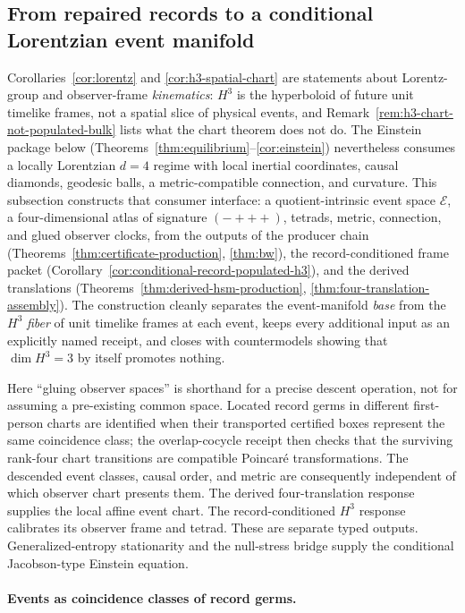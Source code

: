 \documentclass[11pt]{article}
\begin{document}
\subsection{From repaired records to a conditional Lorentzian event manifold}
\label{subsec:event-manifold}

Corollaries~\ref{cor:lorentz} and \ref{cor:h3-spatial-chart} are statements
about Lorentz-group and observer-frame \emph{kinematics}: \(H^3\) is the
hyperboloid of future unit timelike frames, not a spatial slice of physical
events, and Remark~\ref{rem:h3-chart-not-populated-bulk} lists what the chart
theorem does not do. The Einstein package below
(Theorems~\ref{thm:equilibrium}--\ref{cor:einstein}) nevertheless consumes a
locally Lorentzian \(d=4\) regime with local inertial coordinates, causal
diamonds, geodesic balls, a metric-compatible connection, and curvature. This
subsection constructs that consumer interface: a quotient-intrinsic event
space \(\mathcal E\), a four-dimensional atlas of signature \((-{+}{+}{+})\),
tetrads, metric, connection, and glued observer clocks, from the outputs of
the producer chain
(Theorems~\ref{thm:certificate-production}, \ref{thm:bw}), the record-conditioned
frame packet (Corollary~\ref{cor:conditional-record-populated-h3}), and
the derived translations
(Theorems~\ref{thm:derived-hsm-production},
\ref{thm:four-translation-assembly}). The construction cleanly separates the
event-manifold \emph{base} from the \(H^3\) \emph{fiber} of unit timelike
frames at each event, keeps every additional input as an explicitly named
receipt, and closes with countermodels showing that \(\dim H^3=3\) by itself
promotes nothing.

Here ``gluing observer spaces'' is shorthand for a precise descent operation,
not for assuming a pre-existing common space. Located record germs in
different first-person charts are identified when their transported certified
boxes represent the same coincidence class; the overlap-cocycle receipt then
checks that the surviving rank-four chart transitions are compatible
Poincar\'e transformations. The descended event classes, causal order, and
metric are consequently independent of which observer chart presents them.
The derived four-translation response supplies the local affine event chart. The
record-conditioned \(H^3\) response calibrates its observer frame and tetrad. These are
separate typed outputs. Generalized-entropy stationarity and the null-stress bridge supply
the conditional Jacobson-type Einstein equation.

\paragraph{Events as coincidence classes of record germs.}
\end{document}
